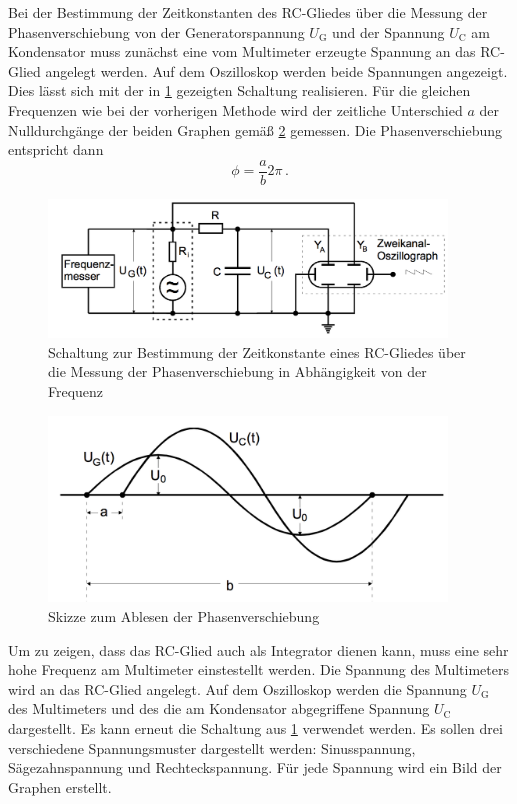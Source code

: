 Bei der Bestimmung der Zeitkonstanten des RC-Gliedes über die Messung der Phasenverschiebung
von der Generatorspannung $U_{\text{G}}$ und der Spannung $U_{\text{C}}$ am Kondensator
muss zunächst eine vom Multimeter erzeugte Spannung an das RC-Glied angelegt werden.
Auf dem Oszilloskop werden beide Spannungen angezeigt. Dies lässt sich mit der in \ref{fig:Schaltung_4c}
gezeigten Schaltung realisieren. Für die gleichen Frequenzen wie bei der vorherigen
Methode wird der zeitliche Unterschied $a$ der Nulldurchgänge der beiden Graphen gemäß
\ref{fig:phasenverschiebung} gemessen. Die Phasenverschiebung entspricht dann
\begin{equation}
  \phi=\frac{a}{b}2\pi\,.
\end{equation}

\begin{figure}
  \centering
  \includegraphics[width=300pt]{data/4c_schaltung.png}
  \caption{Schaltung zur Bestimmung der Zeitkonstante eines RC-Gliedes über die Messung
  der Phasenverschiebung in Abhängigkeit von der Frequenz \cite{Versuchsanleitung}}
  \label{fig:Schaltung_4c}
\end{figure}

\begin{figure}
  \centering
  \includegraphics[width=300pt]{data/phasenverschiebung.png}
  \caption{Skizze zum Ablesen der Phasenverschiebung \cite{Versuchsanleitung}}
  \label{fig:phasenverschiebung}
\end{figure}

Um zu zeigen, dass das RC-Glied auch als Integrator dienen kann, muss eine sehr hohe
Frequenz am Multimeter einstestellt werden. Die Spannung des Multimeters wird an das
RC-Glied angelegt. Auf dem Oszilloskop werden die Spannung $U_{\text{G}}$ des Multimeters und des
die am Kondensator abgegriffene Spannung $U_{\text{C}}$ dargestellt. Es kann erneut die Schaltung
aus \ref{fig:Schaltung_4c} verwendet werden. Es sollen drei verschiedene
Spannungsmuster dargestellt werden: Sinusspannung, Sägezahnspannung und Rechteckspannung.
Für jede Spannung wird ein Bild der Graphen erstellt.
